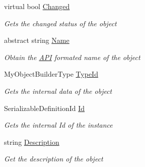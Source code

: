 \begin{DoxyCompactItemize}
\item 
virtual bool \hyperlink{class_s_e_mod_a_p_i_1_1_a_p_i_1_1_definitions_1_1_definition_over_layer_a835702eee631ba8c4c997f3f381f0f64}{Changed}
\begin{DoxyCompactList}\small\item\em Gets the changed status of the object \end{DoxyCompactList}\item 
abstract string \hyperlink{class_s_e_mod_a_p_i_1_1_a_p_i_1_1_definitions_1_1_definition_over_layer_a0b043350c7aa95d62740095e50d01bf2}{Name}
\begin{DoxyCompactList}\small\item\em Obtain the \hyperlink{namespace_s_e_mod_a_p_i_1_1_a_p_i}{A\+P\+I} formated name of the object \end{DoxyCompactList}\item 
My\+Object\+Builder\+Type \hyperlink{class_s_e_mod_a_p_i_1_1_a_p_i_1_1_definitions_1_1_definition_over_layer_ad330405e8176ccb6c5b02e97454bf946}{Type\+Id}
\begin{DoxyCompactList}\small\item\em Gets the internal data of the object \end{DoxyCompactList}\item 
Serializable\+Definition\+Id \hyperlink{class_s_e_mod_a_p_i_1_1_a_p_i_1_1_definitions_1_1_definition_over_layer_a6c3ff1ec07de62f04f6ba5b83045e585}{Id}
\begin{DoxyCompactList}\small\item\em Gets the internal Id of the instance \end{DoxyCompactList}\item 
string \hyperlink{class_s_e_mod_a_p_i_1_1_a_p_i_1_1_definitions_1_1_definition_over_layer_a7fb7eb2bc1717460f3b945143e7bda27}{Description}
\begin{DoxyCompactList}\small\item\em Get the description of the object \end{DoxyCompactList}\end{DoxyCompactItemize}


